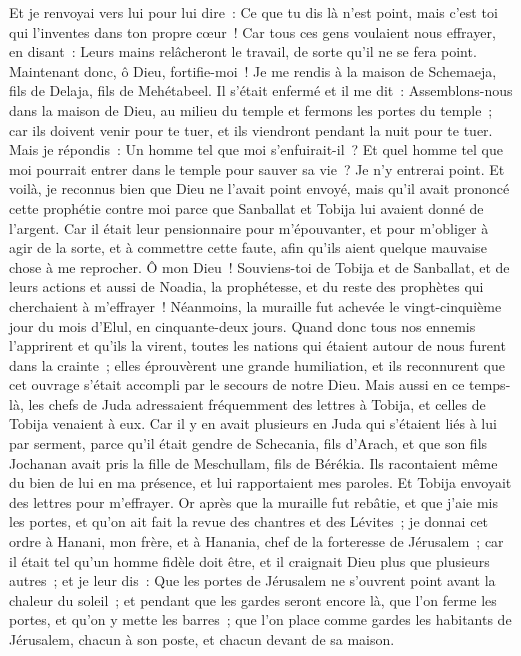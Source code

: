 \begin{multicols}{2}
Et je renvoyai vers lui pour lui dire~: Ce que tu dis là n'est point, mais c'est toi qui l'inventes dans ton propre cœur~!
Car tous ces gens voulaient nous effrayer, en disant~: Leurs mains relâcheront le travail, de sorte qu'il ne se fera point. Maintenant donc, ô Dieu, fortifie-moi~!
Je me rendis à la maison de Schemaeja, fils de Delaja, fils de Mehétabeel. Il s'était enfermé et il me dit~: Assemblons-nous dans la maison de Dieu, au milieu du temple et fermons les portes du temple~; car ils doivent venir pour te tuer, et ils viendront pendant la nuit pour te tuer.
Mais je répondis~: Un homme tel que moi s'enfuirait-il~? Et quel homme tel que moi pourrait entrer dans le temple pour sauver sa vie~? Je n'y entrerai point.
Et voilà, je reconnus bien que Dieu ne l'avait point envoyé, mais qu'il avait prononcé cette prophétie contre moi parce que Sanballat et Tobija lui avaient donné de l'argent.
Car il était leur pensionnaire pour m'épouvanter, et pour m'obliger à agir de la sorte, et à commettre cette faute, afin qu'ils aient quelque mauvaise chose à me reprocher.
Ô mon Dieu~! Souviens-toi de Tobija et de Sanballat, et de leurs actions et aussi de Noadia, la prophétesse, et du reste des prophètes qui cherchaient à m'effrayer~!
Néanmoins, la muraille fut achevée le vingt-cinquième jour du mois d'Elul, en cinquante-deux jours.
Quand donc tous nos ennemis l'apprirent et qu'ils la virent, toutes les nations qui étaient autour de nous furent dans la crainte~; elles éprouvèrent une grande humiliation, et ils reconnurent que cet ouvrage s'était accompli par le secours de notre Dieu.
Mais aussi en ce temps-là, les chefs de Juda adressaient fréquemment des lettres à Tobija, et celles de Tobija venaient à eux.
Car il y en avait plusieurs en Juda qui s'étaient liés à lui par serment, parce qu'il était gendre de Schecania, fils d'Arach, et que son fils Jochanan avait pris la fille de Meschullam, fils de Bérékia.
Ils racontaient même du bien de lui en ma présence, et lui rapportaient mes paroles. Et Tobija envoyait des lettres pour m'effrayer.
\VerseOne{}Or après que la muraille fut rebâtie, et que j'aie mis les portes, et qu'on ait fait la revue des chantres et des Lévites~; 
je donnai cet ordre à Hanani, mon frère, et à Hanania, chef de la forteresse de Jérusalem~; car il était tel qu'un homme fidèle doit être, et il craignait Dieu plus que plusieurs autres~;
et je leur dis~: Que les portes de Jérusalem ne s'ouvrent point avant la chaleur du soleil~; et pendant que les gardes seront encore là, que l'on ferme les portes, et qu'on y mette les barres~; que l'on place comme gardes les habitants de Jérusalem, chacun à son poste, et chacun devant de sa maison.

\end{multicols}
